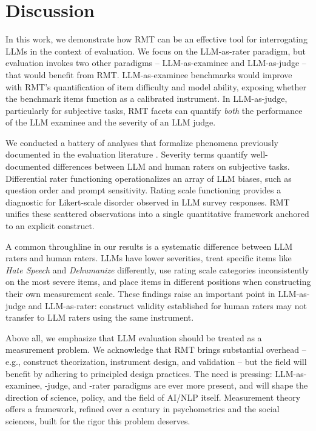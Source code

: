 \documentclass[11pt]{article}
\begin{document}
\section{Discussion}
In this work, we demonstrate how RMT can be an effective tool for interrogating LLMs in the context of evaluation. We focus on the LLM-as-rater paradigm, but evaluation invokes two other paradigms -- LLM-as-examinee and LLM-as-judge -- that would benefit from RMT. LLM-as-examinee benchmarks would improve with RMT's quantification of item difficulty and model ability, exposing whether the benchmark items function as a calibrated instrument. In LLM-as-judge, particularly for subjective tasks, RMT facets can quantify \textit{both} the performance of the LLM examinee and the severity of an LLM judge. 

We conducted a battery of analyses that formalize phenomena previously documented in the evaluation literature \cite{Jiao2026RaterEffects, Wu2026EssayRaters, Jin2025MFRMWriting, Oh2025ChatGPT4oMFRM, Li2025ScoringBias, Xu2026PositionBias}. Severity terms quantify well-documented differences between LLM and human raters on subjective tasks. Differential rater functioning operationalizes an array of LLM biases, such as question order and prompt sensitivity. Rating scale functioning provides a diagnostic for Likert-scale disorder observed in LLM survey responses. RMT unifies these scattered observations into a single quantitative framework anchored to an explicit construct.

A common throughline in our results is a systematic difference between LLM raters and human raters. LLMs have lower severities, treat specific items like \textit{Hate Speech} and \textit{Dehumanize} differently, use rating scale categories
inconsistently on the most severe items, and place items in different positions when constructing their own measurement scale. These findings raise an important point in LLM-as-judge and LLM-as-rater: construct validity established for human raters may not transfer to LLM raters using the same instrument. 

Above all, we emphasize that LLM evaluation should be treated as a measurement problem. We acknowledge that RMT brings substantial overhead -- e.g., construct theorization, instrument design, and validation -- but the field will benefit by adhering to principled design practices. The need is pressing: LLM-as-examinee, -judge, and -rater paradigms are ever more present, and will shape the direction of science, policy, and the field of AI/NLP itself. Measurement theory offers a framework, refined over a century in psychometrics and the social sciences, built for the rigor this problem deserves.
\end{document}
